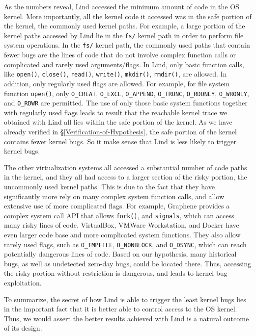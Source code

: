As the numbers reveal, Lind accessed the minimum amount of code in the OS
kernel. More importantly, 
all the kernel code it accessed was in the safe portion of the kernel, the
commonly used kernel paths. 
For example, a large portion of the kernel paths accessed by Lind lie in 
the \texttt{fs/} kernel path in order to perform file system operations. 
In the \texttt{fs/} kernel path, the commonly used paths that contain 
fewer bugs are the lines of code that do not involve complex function calls 
or complicated and rarely used arguments/flags. In Lind, only basic function calls, 
like \texttt{open()}, \texttt{close()}, \texttt{read()}, \texttt{write()}, \texttt{mkdir()}, 
\texttt{rmdir()}, are allowed. In addition, only regularly used flags are allowed. 
For example, for file system function \texttt{open()}, only 
\texttt{O\_CREAT}, \texttt{O\_EXCL}, \texttt{O\_APPEND}, \texttt{O\_TRUNC}, 
\texttt{O\_RDONLY}, \texttt{O\_WRONLY}, and \texttt{O\_RDWR} are permitted. 
The use of only those basic system functions together with regularly used flags leads to 
result that the reachable kernel trace we obtained with Lind all lies within the safe 
portion of the kernel. 
As we have already verified in \S{\ref{Verification-of-Hypothesis}}, the safe portion of 
the kernel contains fewer kernel bugs. 
So it make sense that Lind is less likely to trigger kernel bugs. 

The other virtualization systems all accessed a substantial number of code
paths in the kernel, 
and they all had access to a larger section of the risky portion, the
uncommonly used kernel paths. This is due to the fact that they have 
significantly more rely on many complex system function calls, and 
allow extensive use of more complicated flags. For example, 
Graphene provides a complex system call API that allows 
\texttt{fork()}, and \texttt{signals}, which can access many risky lines of code. 
VirtualBox, VMWare Workstation, and Docker have even larger 
code base and more complicated system functions. They also allow 
rarely used flags, such as \texttt{O\_TMPFILE}, \texttt{O\_NONBLOCK}, 
and \texttt{O\_DSYNC}, which can reach potentially dangerous lines 
of code.  
%
Based on our hypothesis, many historical bugs, as well as undetected
zero-day bugs, could be located there. 
Thus, accessing the risky portion without restriction is dangerous, and
leads to kernel bug exploitation. 

To summarize, the secret of how Lind is able to trigger the least kernel
bugs lies in the important fact that 
it is better able to control access to the OS kernel. 
Thus, we would assert the better results achieved with Lind is a natural
outcome of its design.

